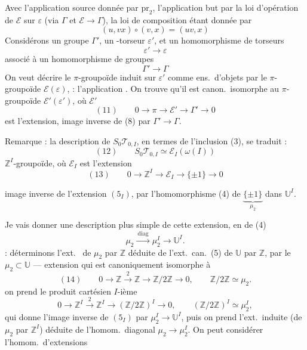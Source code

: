 \documentclass[11pt,a4paper]{article}
\begin{document}

Avec l'application source donnée par $\mathrm{pr}_2$, l'application but par la loi d'opération de $\mathcal{E}$ sur $\varepsilon$ (via $\Gamma$ et $\mathcal{E} \to \Gamma$), la loi de composition étant donnée par
\[
  (u, vx) \circ (v, x) = (uv, x)
\]
Considérons un groupe $\Gamma'$, un -torseur $\varepsilon'$, et un homomorphisme de torseurs
\[
  \varepsilon' \longrightarrow \varepsilon
\]
associé à un homomorphisme de groupes
\[
  \Gamma' \longrightarrow \Gamma
\]
On veut décrire le $\pi$-groupoïde induit sur $\varepsilon'$ comme ens.\ d'objets par le $\pi$-groupoïde $\mathcal{E}(\varepsilon)$, \ill{} : l'application \ill{}. On trouve qu'il est canon.\ isomorphe au $\pi$-groupoïde $\mathcal{E}'(\varepsilon')$, où $\mathcal{E}'$
\[
  (11) \qquad 0 \to \pi \to \mathcal{E}' \to \Gamma' \to 0
\]
est l'extension, image inverse de (8) par $\Gamma' \to \Gamma$.

Remarque : la description de $S_0\mathcal{T}_{0,I}$, en termes de l'inclusion (3), se traduit :
\[
  (12) \qquad S_0\mathcal{T}_{0,I} \simeq \mathcal{E}_I(\omega(I))
\]
 $\mathbb{Z}^I$-groupoïde,
où $\mathcal{E}_I$ est l'extension
\[
  (13) \qquad 0 \to \mathbb{Z}^I \to \mathcal{E}_I \to \{\pm 1\} \to 0
\]

image inverse de l'extension $(5_I)$, par l'homomorphisme (4) de $\underbrace{\{\pm1\}}_{\mu_2}$ dans $\mathbb{U}^I$.

Je vais donner une description plus simple de cette extension, en \struck{\ill{}}  \struck{\ill{}} \ill{} de (4)
\[
  \mu_2 \xrightarrow{\ \mathrm{diag}\ } \mu_2^I \longrightarrow \mathbb{U}^I .
\]
 \ill{} \ill{} : déterminons l'ext.\ \ill{} de $\mu_2$ par $\mathbb{Z}$ déduite de l'ext.\ can.\ (5) de $\mathbb{U}$ par $\mathbb{Z}$, par le  $\mu_2 \subset \mathbb{U}$ --- extension qui est canoniquement isomorphe à
\[
  (14) \qquad 0 \to \mathbb{Z} \xrightarrow{\ 2\ } \mathbb{Z} \to \mathbb{Z}/2\mathbb{Z} \to 0 ,
  \qquad \mathbb{Z}/2\mathbb{Z} \simeq \mu_2 .
\]
 on prend le produit cartésien $I$-ième \ill{}
\[
  0 \to \mathbb{Z}^I \xrightarrow{\ 2\ } \mathbb{Z}^I \to (\mathbb{Z}/2\mathbb{Z})^I \to 0 ,
  \qquad (\mathbb{Z}/2\mathbb{Z})^I \simeq \mu_2^I ,
\]
qui donne l'image inverse de $(5_I)$ par $\mu_2^I \to \mathbb{U}^I$, puis on prend l'ext.\ induite (de $\mu_2$ par $\mathbb{Z}^I$) déduite de l'homom.\ diagonal $\mu_2 \to \mu_2^I$. On peut considérer l'homom.\ d'extensions
\end{document}
